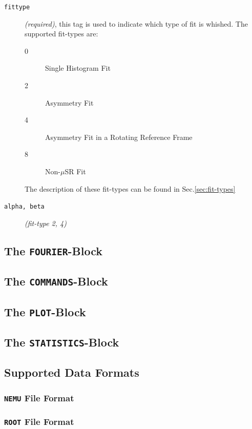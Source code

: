 \documentclass[twoside]{article}
\newcommand{\musr}{$\mu$SR\xspace}
\begin{document}
\begin{description}
 \item[\texttt{fittype}] \textsl{(required)}, this tag is used to indicate which type of fit 
         is whished. The supported fit-types are:
         \begin{description}
           \item[0] Single Histogram Fit
           \item[2] Asymmetry Fit
           \item[4] Asymmetry Fit in a Rotating Reference Frame
           \item[8] Non-\musr Fit
         \end{description}
         The description of these fit-types can be found in Sec.\ref{sec:fit-types}
  \item[\texttt{alpha, beta}] \textsl{(fit-type 2, 4)}
\end{description}


\subsection{The \texttt{FOURIER}-Block}\label{subsec:msr-file-fourier-block}%

\subsection{The \texttt{COMMANDS}-Block}\label{subsec:msr-file-commands-block}%

\subsection{The \texttt{PLOT}-Block}\label{subsec:msr-file-plot-block}%

\subsection{The \texttt{STATISTICS}-Block}\label{subsec:msr-file-statistics-block}%

\subsection{Supported Data Formats}\label{subsec:supported-data-formats}%
\subsubsection{\texttt{NEMU} File Format}\label{subsubsec:nemu-format}%
\subsubsection{\texttt{ROOT} File Format}\label{subsubsec:root-format}%
\end{document}
